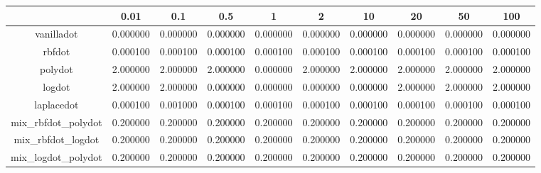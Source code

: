 \begin{table}[ht]
\centering
\begin{tabular}{cccccccccc}
  \hline
 & 0.01 & 0.1 & 0.5 & 1 & 2 & 10 & 20 & 50 & 100 \\ 
  \hline
vanilladot & 0.000000 & 0.000000 & 0.000000 & 0.000000 & 0.000000 & 0.000000 & 0.000000 & 0.000000 & 0.000000 \\ 
  rbfdot & 0.000100 & 0.000100 & 0.000100 & 0.000100 & 0.000100 & 0.000100 & 0.000100 & 0.000100 & 0.000100 \\ 
  polydot & 2.000000 & 2.000000 & 2.000000 & 0.000000 & 2.000000 & 2.000000 & 2.000000 & 2.000000 & 2.000000 \\ 
  logdot & 2.000000 & 2.000000 & 0.000000 & 0.000000 & 0.000000 & 0.000000 & 2.000000 & 2.000000 & 2.000000 \\ 
  laplacedot & 0.000100 & 0.001000 & 0.000100 & 0.000100 & 0.000100 & 0.000100 & 0.000100 & 0.000100 & 0.000100 \\ 
  mix\_rbfdot\_polydot & 0.200000 & 0.200000 & 0.200000 & 0.200000 & 0.200000 & 0.200000 & 0.200000 & 0.200000 & 0.200000 \\ 
  mix\_rbfdot\_logdot & 0.200000 & 0.200000 & 0.200000 & 0.200000 & 0.200000 & 0.200000 & 0.200000 & 0.200000 & 0.200000 \\ 
  mix\_logdot\_polydot & 0.200000 & 0.200000 & 0.200000 & 0.200000 & 0.200000 & 0.200000 & 0.200000 & 0.200000 & 0.200000 \\ 
   \hline
\end{tabular}
\end{table}

